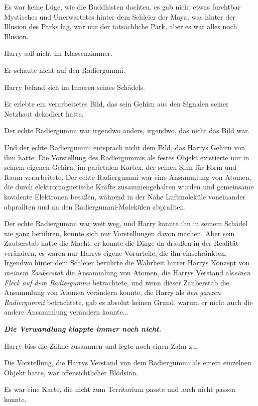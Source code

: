 Es war keine Lüge, wie die Buddhisten dachten, es gab nicht etwas furchtbar
Mystisches und Unerwartetes hinter dem Schleier der Maya, was hinter der
Illusion des Parks lag, war nur der tatsächliche Park, aber es war alles noch
Illusion.

Harry saß nicht im Klassenzimmer.

Er schaute nicht auf den Radiergummi.

Harry befand sich im Inneren seines Schädels.

Er erlebte ein verarbeitetes Bild, das sein Gehirn aus den Signalen seiner
Netzhaut dekodiert hatte.

Der echte Radiergummi war irgendwo anders, irgendwo, das nicht das Bild war.

Und der echte Radiergummi entsprach nicht dem Bild, das Harrys Gehirn von ihm
hatte. Die Vorstellung des Radiergummis als festes Objekt existierte nur in
seinem eigenen Gehirn, im parietalen Kortex, der seinen Sinn für Form und Raum
verarbeitete. Der echte Radiergummi war eine Ansammlung von Atomen, die durch
elektromagnetische Kräfte zusammengehalten wurden und gemeinsame kovalente
Elektronen besaßen, während in der Nähe Luftmoleküle voneinander abprallten und
an den Radiergummi-Molekülen abprallten.

Der echte Radiergummi war weit weg, und Harry konnte ihn in seinem Schädel nie
ganz berühren, konnte sich nur Vorstellungen davon machen. Aber sein Zauberstab
hatte die Macht, er konnte die Dinge da draußen in der Realität verändern, es
waren nur Harrys eigene Vorurteile, die ihn einschränkten. Irgendwo hinter dem
Schleier berührte die Wahrheit hinter Harrys Konzept von \emph{\glqq{}meinem
Zauberstab\grqq{}} die Ansammlung von Atomen, die Harrys Verstand
als\emph{\glqq{}einen Fleck auf dem Radiergummi\grqq{}} betrachtete, und wenn
dieser Zauberstab die Ansammlung von Atomen verändern konnte, die Harry als
\emph{\glqq{}den ganzen Radiergummi\grqq{}} betrachtete, gab es absolut keinen
Grund, warum er nicht auch die andere Ansammlung verändern konnte...

\textbf{\emph{Die Verwandlung klappte immer noch nicht.}}

Harry biss die Zähne zusammen und legte noch einen Zahn zu.

Die Vorstellung, die Harrys Verstand von dem Radiergummi als einem einzelnen
Objekt hatte, war offensichtlicher Blödsinn.

Es war eine Karte, die nicht zum Territorium passte und auch nicht passen
konnte.

